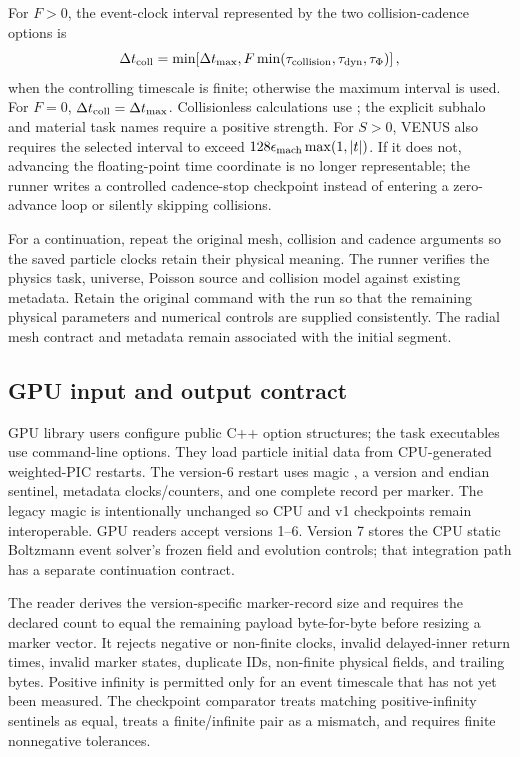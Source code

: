 For \(F>0\), the event-clock interval represented by the two collision-cadence
options is
\begin{equation}
 \Delta t_{\rm coll}=\min\!\left[\Delta t_{\max},
 F\min(\tau_{\rm collision},\tau_{\rm dyn},\tau_{\Phi})\right],
\end{equation}
when the controlling timescale is finite; otherwise the maximum interval is
used.  For \(F=0\),
\(\Delta t_{\rm coll}=\Delta t_{\max}\).  Collisionless calculations use
; the explicit subhalo and material task names
require a positive strength.
For \(S>0\), VENUS also requires the selected interval to exceed
\(128\epsilon_{\rm mach}\max(1,|t|)\).  If it does not, advancing the
floating-point time coordinate is no longer representable; the runner writes
a controlled cadence-stop checkpoint instead of entering a zero-advance
loop or silently skipping collisions.

For a continuation, repeat the original mesh, collision and cadence
arguments so the saved particle clocks retain their physical meaning.  The runner verifies the physics task, universe, Poisson source
and collision model against existing metadata.  Retain the original command
with the run so that the remaining physical parameters and numerical
controls are supplied consistently.  The radial mesh contract and metadata
remain associated with the initial segment.

\subsection{GPU input and output contract}

GPU library users configure public C++ option structures; the task executables
use command-line options. They load particle initial data from CPU-generated
weighted-PIC restarts.  The version-6 restart uses magic , a version and
endian sentinel, metadata clocks/counters, and one complete record per marker.
The legacy magic is intentionally unchanged so CPU and v1 checkpoints remain
interoperable.
GPU readers accept versions 1--6. Version 7 stores the CPU static
Boltzmann event solver's frozen field and evolution controls; that
integration path has a separate continuation contract.

The reader derives the version-specific marker-record size and requires the
declared count to equal the remaining payload byte-for-byte before resizing a
marker vector.  It rejects negative or non-finite clocks, invalid delayed-inner
return times, invalid marker states, duplicate IDs, non-finite physical fields,
and trailing bytes.  Positive infinity is permitted only for an event
timescale that has not yet been measured.  The checkpoint comparator treats
matching positive-infinity sentinels as equal, treats a finite/infinite pair as
a mismatch, and requires finite nonnegative tolerances.

